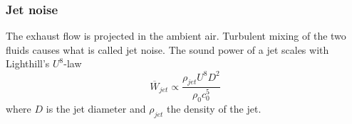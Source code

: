 \subsubsection{Jet noise }
The exhaust flow is projected in the ambient air. Turbulent mixing of the two
fluids causes what is called jet noise. The sound power of a jet scales with Lighthill's $U^8$-law
\begin{equation}
  \overline{W}_{jet} \propto \frac{\rho_{jet} U^8 D^2}{ \rho_0 c_0^5}
\end{equation}
where $D$ is the jet diameter and $\rho_{jet}$ the density of the jet.





%
%
%
%
%
%
%
%
